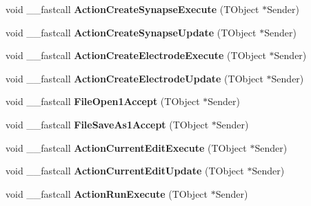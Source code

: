 \begin{DoxyCompactItemize}
\item 
\hypertarget{class_t_network_g_u_i_a21750113c91893e4bc96e3c5fc9b5341}{void \+\_\+\+\_\+fastcall {\bfseries Action\+Create\+Synapse\+Execute} (T\+Object $\ast$Sender)}\label{class_t_network_g_u_i_a21750113c91893e4bc96e3c5fc9b5341}

\item 
\hypertarget{class_t_network_g_u_i_a455a4dbfb87092aa9f31f1b8d94cc915}{void \+\_\+\+\_\+fastcall {\bfseries Action\+Create\+Synapse\+Update} (T\+Object $\ast$Sender)}\label{class_t_network_g_u_i_a455a4dbfb87092aa9f31f1b8d94cc915}

\item 
\hypertarget{class_t_network_g_u_i_aa84f2d4ff3061491dd0e39e7d8961353}{void \+\_\+\+\_\+fastcall {\bfseries Action\+Create\+Electrode\+Execute} (T\+Object $\ast$Sender)}\label{class_t_network_g_u_i_aa84f2d4ff3061491dd0e39e7d8961353}

\item 
\hypertarget{class_t_network_g_u_i_aa6f3a85b99b456f7cead656aeea33057}{void \+\_\+\+\_\+fastcall {\bfseries Action\+Create\+Electrode\+Update} (T\+Object $\ast$Sender)}\label{class_t_network_g_u_i_aa6f3a85b99b456f7cead656aeea33057}

\item 
\hypertarget{class_t_network_g_u_i_ab5aa6e82815692e79755aa64be679aa3}{void \+\_\+\+\_\+fastcall {\bfseries File\+Open1\+Accept} (T\+Object $\ast$Sender)}\label{class_t_network_g_u_i_ab5aa6e82815692e79755aa64be679aa3}

\item 
\hypertarget{class_t_network_g_u_i_a309bb3756d0b0d57fd49c517f9687b96}{void \+\_\+\+\_\+fastcall {\bfseries File\+Save\+As1\+Accept} (T\+Object $\ast$Sender)}\label{class_t_network_g_u_i_a309bb3756d0b0d57fd49c517f9687b96}

\item 
\hypertarget{class_t_network_g_u_i_a9586d5cfe110f4f5f26d1ed088349ab0}{void \+\_\+\+\_\+fastcall {\bfseries Action\+Current\+Edit\+Execute} (T\+Object $\ast$Sender)}\label{class_t_network_g_u_i_a9586d5cfe110f4f5f26d1ed088349ab0}

\item 
\hypertarget{class_t_network_g_u_i_a02fc50defaacd0eafacbfa3265c59cde}{void \+\_\+\+\_\+fastcall {\bfseries Action\+Current\+Edit\+Update} (T\+Object $\ast$Sender)}\label{class_t_network_g_u_i_a02fc50defaacd0eafacbfa3265c59cde}

\item 
\hypertarget{class_t_network_g_u_i_a12517ab21c4d899be50f0c07f2032272}{void \+\_\+\+\_\+fastcall {\bfseries Action\+Run\+Execute} (T\+Object $\ast$Sender)}\label{class_t_network_g_u_i_a12517ab21c4d899be50f0c07f2032272}


\end{DoxyCompactItemize}
